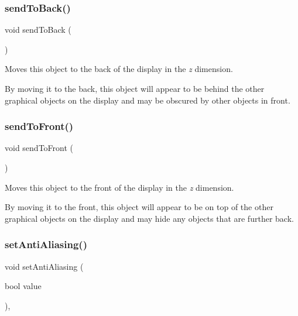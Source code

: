 \subsubsection{\texorpdfstring{send\+To\+Back()}{sendToBack()}}
{\footnotesize\ttfamily void send\+To\+Back (\begin{DoxyParamCaption}{ }\end{DoxyParamCaption})\hspace{0.3cm}{\ttfamily [inherited]}}



Moves this object to the back of the display in the {\itshape z} dimension. 

By moving it to the back, this object will appear to be behind the other graphical objects on the display and may be obscured by other objects in front. \mbox{\label{classsgl_1_1GObject_aee33d68488e46827ef55fac07f40a9b2}} 
\subsubsection{\texorpdfstring{send\+To\+Front()}{sendToFront()}}
{\footnotesize\ttfamily void send\+To\+Front (\begin{DoxyParamCaption}{ }\end{DoxyParamCaption})\hspace{0.3cm}{\ttfamily [inherited]}}



Moves this object to the front of the display in the {\itshape z} dimension. 

By moving it to the front, this object will appear to be on top of the other graphical objects on the display and may hide any objects that are further back. \mbox{\label{classsgl_1_1GObject_a1e43371668ae850193cebedb44e1bbe3}} 
\subsubsection{\texorpdfstring{set\+Anti\+Aliasing()}{setAntiAliasing()}}
{\footnotesize\ttfamily void set\+Anti\+Aliasing (\begin{DoxyParamCaption}\item[{bool}]{value }\end{DoxyParamCaption})\hspace{0.3cm}{\ttfamily [static]}, {\ttfamily [inherited]}}



